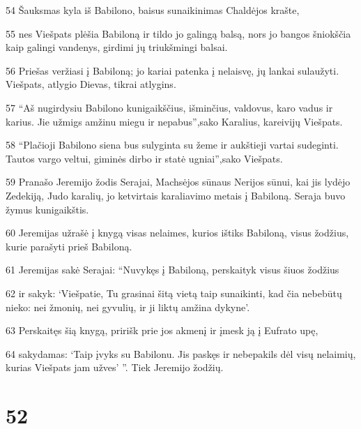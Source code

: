 \par 54 Šauksmas kyla iš Babilono, baisus sunaikinimas Chaldėjos krašte, 
\par 55 nes Viešpats plėšia Babiloną ir tildo jo galingą balsą, nors jo bangos šniokščia kaip galingi vandenys, girdimi jų triukšmingi balsai. 
\par 56 Priešas veržiasi į Babiloną; jo kariai patenka į nelaisvę, jų lankai sulaužyti. Viešpats, atlygio Dievas, tikrai atlygins. 
\par 57 “Aš nugirdysiu Babilono kunigaikščius, išminčius, valdovus, karo vadus ir karius. Jie užmigs amžinu miegu ir nepabus”,­sako Karalius, kareivijų Viešpats. 
\par 58 “Plačioji Babilono siena bus sulyginta su žeme ir aukštieji vartai sudeginti. Tautos vargo veltui, giminės dirbo ir statė ugniai”,­sako Viešpats. 
\par 59 Pranašo Jeremijo žodis Serajai, Machsėjos sūnaus Nerijos sūnui, kai jis lydėjo Zedekiją, Judo karalių, jo ketvirtais karaliavimo metais į Babiloną. Seraja buvo žymus kunigaikštis. 
\par 60 Jeremijas užrašė į knygą visas nelaimes, kurios ištiks Babiloną, visus žodžius, kurie parašyti prieš Babiloną. 
\par 61 Jeremijas sakė Serajai: “Nuvykęs į Babiloną, perskaityk visus šiuos žodžius 
\par 62 ir sakyk: ‘Viešpatie, Tu grasinai šitą vietą taip sunaikinti, kad čia nebebūtų nieko: nei žmonių, nei gyvulių, ir ji liktų amžina dykyne’. 
\par 63 Perskaitęs šią knygą, pririšk prie jos akmenį ir įmesk ją į Eufrato upę, 
\par 64 sakydamas: ‘Taip įvyks su Babilonu. Jis paskęs ir nebepakils dėl visų nelaimių, kurias Viešpats jam užves’ ”. Tiek Jeremijo žodžių.



\chapter{52}


